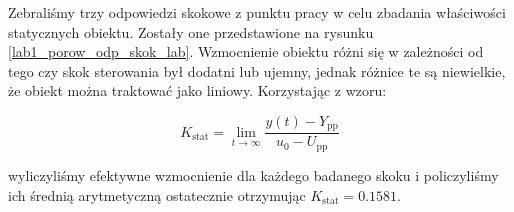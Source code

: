 Zebraliśmy trzy odpowiedzi
skokowe z punktu pracy w celu zbadania właściwości statycznych obiektu. 
Zostały one przedstawione na rysunku \ref{lab1_porow_odp_skok_lab}. 
Wzmocnienie obiektu różni się w zależności od tego czy skok sterowania 
był dodatni lub ujemny, jednak różnice te są niewielkie, że obiekt 
można traktować jako liniowy. Korzystając z wzoru:

\begin{equation}
    K_{\mathrm{stat}} = \lim_{t \to \infty} \frac{y(t)- Y_{\mathrm{pp}}}{u_0 - U_{\mathrm{pp}}}
    \label{zad2_wzm_statyczne_wzor}
 \end{equation}

wyliczyliśmy efektywne wzmocnienie dla każdego badanego skoku i policzyliśmy ich średnią arytmetyczną ostatecznie
otrzymując $K_{\mathrm{stat}} = \num{0,1581}$.